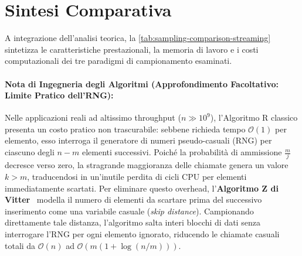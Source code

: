 \FloatBarrier
\FloatBarrier
\section{Sintesi Comparativa}
\label{sec:comparative-synthesis}

A integrazione dell'analisi teorica, la \autoref{tab:sampling-comparison-streaming} sintetizza le caratteristiche prestazionali, la memoria di lavoro e i costi computazionali dei tre paradigmi di campionamento esaminati.

\begin{table}[H]
  \centering
  \caption{Confronto sintetico tra le metodologie di campionamento su flussi di dati.}
  \label{tab:sampling-comparison-streaming}
\end{table}

\paragraph{Nota di Ingegneria degli Algoritmi (Approfondimento Facoltativo: Limite Pratico dell'RNG):}
Nelle applicazioni reali ad altissimo throughput ($n \gg 10^9$), l'Algoritmo R classico presenta un costo pratico non trascurabile: sebbene richieda tempo $\mathcal{O}(1)$ per elemento, esso interroga il generatore di numeri pseudo-casuali (RNG) per ciascuno degli $n - m$ elementi successivi. Poiché la probabilità di ammissione $\frac{m}{j}$ decresce verso zero, la stragrande maggioranza delle chiamate genera un valore $k > m$, traducendosi in un'inutile perdita di cicli CPU per elementi immediatamente scartati.
Per eliminare questo overhead, l'\textbf{Algoritmo Z di Vitter}~\cite{vitter1985} modella il numero di elementi da scartare prima del successivo inserimento come una variabile casuale (\textit{skip distance}). Campionando direttamente tale distanza, l'algoritmo salta interi blocchi di dati senza interrogare l'RNG per ogni elemento ignorato, riducendo le chiamate casuali totali da $\mathcal{O}(n)$ ad $\mathcal{O}(m(1 + \log(n/m)))$.
